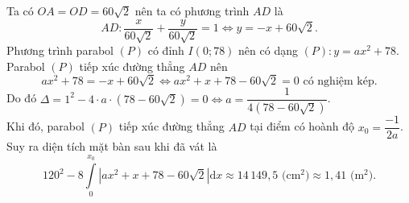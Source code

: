 \begin{ex}
{\begin{center}
		\end{center}
		Ta có $OA=OD=60\sqrt{2}$ nên ta có phương trình $AD$ là \[AD\colon \dfrac{x}{60\sqrt{2}}+\dfrac{y}{60\sqrt{2}}=1\Leftrightarrow y=-x+60\sqrt{2}.\]
		Phương trình parabol $(P)$ có đỉnh $I(0;78)$ nên có dạng $(P)\colon y=ax^2+78$.\\
		Parabol $(P)$ tiếp xúc đường thẳng $AD$ nên
		\[ax^2+78=-x+60\sqrt{2}\Leftrightarrow ax^2+x+78-60\sqrt{2}=0 \text{ có nghiệm kép.}\]
		Do đó $\Delta=1^2-4\cdot a\cdot \left(78-60\sqrt{2}\right)=0\Leftrightarrow a=\dfrac{1}{4\left(78-60\sqrt{2}\right)}$.\\
		Khi đó, parabol $(P)$ tiếp xúc đường thẳng $AD$ tại điểm có hoành độ $x_0=\dfrac{-1}{2a}$.\\
		Suy ra diện tích mặt bàn sau khi đã vát là
		\[120^2-8\displaystyle\int\limits_0^{x_0} \left|ax^2+x+78-60\sqrt{2}\right|\mathrm{d}x\approx 14\,149{,}5\text{ (cm$^2$)}\approx 1{,}41\text{ (m$^2$)}.\]
	}
\end{ex}

